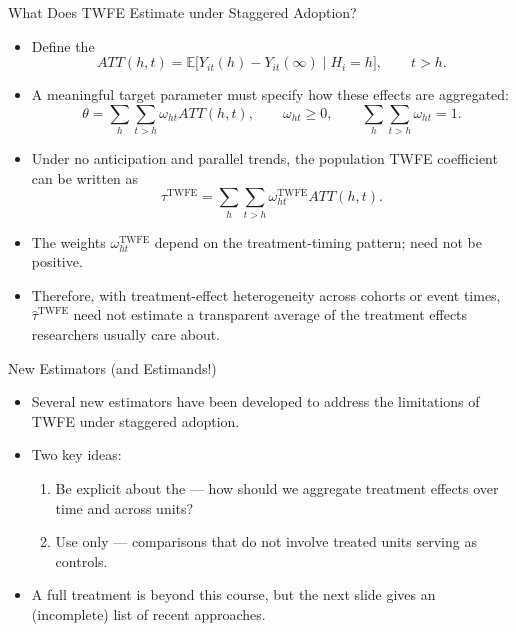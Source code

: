 \documentclass[11pt,aspectratio=169]{beamer}
\newcommand{\E}{\mathbb{E}}
\begin{document}
\begin{frame}{What Does TWFE Estimate under Staggered Adoption?}
\small
\begin{itemize}
  \item Define the 
  \[ATT(h,t)=\E\bigl[Y_{it}(h)-Y_{it}(\infty)\mid H_i=h\bigr],\qquad t>h.\]
  \item A meaningful target parameter must specify how these effects are aggregated:
  \[\theta=\sum_h\sum_{t>h}\omega_{ht}ATT(h,t),\qquad\omega_{ht}\ge0,\qquad\sum_h\sum_{t>h}\omega_{ht}=1.\]
  \item Under no anticipation and parallel trends, the population TWFE coefficient can be written as
  \[\tau^{\text{TWFE}}=\sum_h\sum_{t>h}\omega^{\text{TWFE}}_{ht}ATT(h,t).\]
  \item The weights $\omega^{\text{TWFE}}_{ht}$ depend on the treatment-timing pattern; need not be positive.
  \item Therefore, with treatment-effect heterogeneity across cohorts or event times, $\widehat\tau^{\text{TWFE}}$ need not estimate a transparent average of the treatment effects researchers usually care about.
\end{itemize}
\end{frame}

\begin{frame}{New Estimators (and Estimands!)}
\begin{itemize}
  \item Several new estimators have been developed to address the limitations of TWFE under staggered adoption.
  \item Two key ideas:
  \begin{enumerate}
    \item Be explicit about the  --- how should we aggregate treatment effects over time and across units?
    \item Use only  --- comparisons that do not involve treated units serving as controls.
  \end{enumerate}
  \item A full treatment is beyond this course, but the next slide gives an (incomplete) list of recent approaches.
\end{itemize}
\end{frame}
\end{document}
